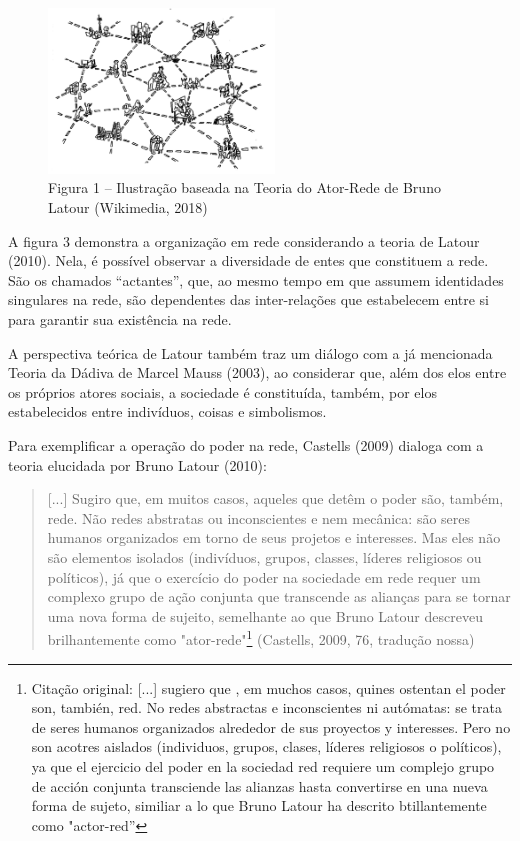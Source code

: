 \begin{figure}[!ht]
  \includegraphics[width=60mm]{./imgs/grafico4.jpg}
\caption{Figura 1 -- Ilustração baseada na Teoria do Ator-Rede de Bruno Latour (Wikimedia, 2018)}
 \end{figure}

A figura 3 demonstra a organização em rede considerando a teoria de
Latour (2010). Nela, é possível observar a diversidade de entes que
constituem a rede. São os chamados ``actantes'', que, ao mesmo tempo em
que assumem identidades singulares na rede, são dependentes das
inter-relações que estabelecem entre si para garantir sua existência na
rede.

A perspectiva teórica de Latour também traz um diálogo com a já
mencionada Teoria da Dádiva de Marcel Mauss (2003), ao considerar que,
além dos elos entre os próprios atores sociais, a sociedade é
constituída, também, por elos estabelecidos entre indivíduos, coisas e
simbolismos.

Para exemplificar a operação do poder na rede, Castells (2009) dialoga
com a teoria elucidada por Bruno Latour (2010):

\begin{quote}
{[}...{]} Sugiro que, em muitos casos, aqueles que detêm o poder são,
também, rede. Não redes abstratas ou inconscientes e nem mecânica: são
seres humanos organizados em torno de seus projetos e interesses. Mas
eles não são elementos isolados (indivíduos, grupos, classes, líderes
religiosos ou políticos), já que o exercício do poder na sociedade em
rede requer um complexo grupo de ação conjunta que transcende as
alianças para se tornar uma nova forma de sujeito, semelhante ao que
Bruno Latour descreveu brilhantemente como "ator-rede"\footnote{Citação
  original: {[}...{]} sugiero que , em muchos casos, quines ostentan el
  poder son, también, red. No redes abstractas e inconscientes ni
  autómatas: se trata de seres humanos organizados alrededor de sus
  proyectos y interesses. Pero no son acotres aislados (individuos,
  grupos, clases, líderes religiosos o políticos), ya que el ejercicio
  del poder en la sociedad red requiere um complejo grupo de acción
  conjunta transciende las alianzas hasta convertirse en una nueva forma
  de sujeto, similiar a lo que Bruno Latour ha descrito btillantemente
  como "actor-red''} (Castells, 2009, 76, tradução nossa)
\end{quote}

